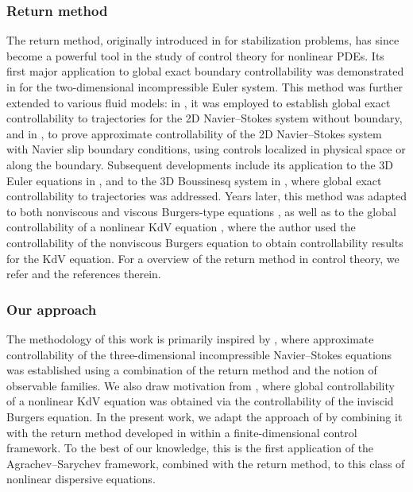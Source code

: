 \documentclass[10pt, reqno]{amsart}
\numberwithin{equation}{section}
\begin{document}
\subsubsection{Return method} The return method, originally introduced in \cite{Coron_return_stabilization_1992} for stabilization problems, has since become a powerful tool in the study of control theory for nonlinear PDEs. Its first major application to global exact boundary controllability was demonstrated in \cite{Coron_JMPA_1996} for the two-dimensional incompressible Euler system. This method was further extended to various fluid models: in \cite{Coron_Fursikov_1996}, it was employed to establish global exact controllability to trajectories for the 2D Navier–Stokes system without boundary, and in \cite{Coron_ESIAM_1996}, to prove approximate controllability of the 2D Navier–Stokes system with Navier slip boundary conditions, using controls localized in physical space or along the boundary. Subsequent developments include its application to the 3D Euler equations in \cite{Glass_2000}, and to the 3D Boussinesq system in \cite{Fursikov_Imanuvilov_1999}, where global exact controllability to trajectories was addressed. Years later, this method was adapted to both nonviscous and viscous Burgers-type equations \cite{Chapouly_Burger_2009}, as well as to the global controllability of a nonlinear KdV equation \cite{Chapouly_KdV_2009}, where the author used the controllability of the nonviscous Burgers equation to obtain controllability results for the KdV equation. For a overview of the return method in control theory, we refer \cite[Chapter 6]{Coron_book_2007} and the references therein.
\subsubsection{Our approach} The methodology of this work is primarily inspired by \cite{Nersesyan_2021_Sicon}, where approximate controllability of the three-dimensional incompressible Navier--Stokes equations was established using a combination of the return method and the notion of observable families. We also draw motivation from \cite{Chapouly_KdV_2009}, where global controllability of a nonlinear KdV equation was obtained via the controllability of the inviscid Burgers equation. In the present work, we adapt the approach of \cite{Nersesyan_2021_Sicon} by combining it with the return method developed in \cite{Chapouly_KdV_2009} within a finite-dimensional control framework. To the best of our knowledge, this is the first application of the Agrachev--Sarychev framework, combined with the return method, to this class of nonlinear dispersive equations.
\end{document}
